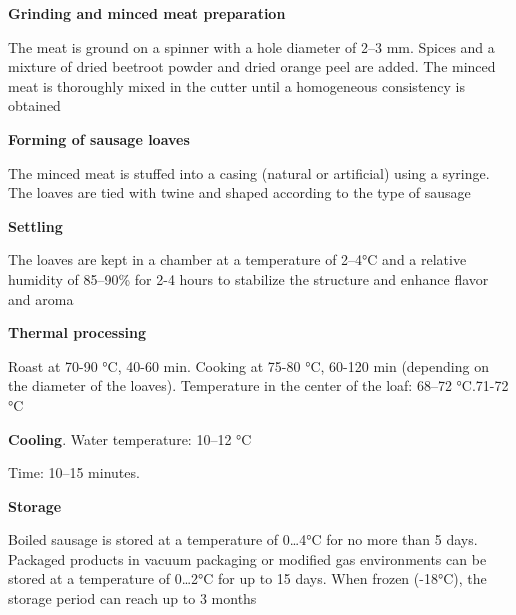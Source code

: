 \begin{multicols}{2}
{\bfseries Grinding and minced meat preparation}

The meat is ground on a spinner with a hole diameter of 2--3 mm. Spices
and a mixture of dried beetroot powder and dried orange peel are added.
The minced meat is thoroughly mixed in the cutter until a homogeneous
consistency is obtained

{\bfseries Forming of sausage loaves}

The minced meat is stuffed into a casing (natural or artificial) using a
syringe. The loaves are tied with twine and shaped according to the type
of sausage

{\bfseries Settling}

The loaves are kept in a chamber at a temperature of 2--4°C and a
relative humidity of 85--90\% for 2-4 hours to stabilize the structure
and enhance flavor and aroma

{\bfseries Thermal processing}

Roast at 70-90 °C, 40-60 min. Cooking at 75-80 °C, 60-120 min (depending
on the diameter of the loaves). Temperature in the center of the loaf:
68--72 °C.71-72 °C

{\bfseries Cooling}. Water temperature: 10--12 °C

Time: 10--15 minutes.

{\bfseries Storage}

Boiled sausage is stored at a temperature of 0\ldots4°C for no more than
5 days. Packaged products in vacuum packaging or modified gas
environments can be stored at a temperature of 0\ldots2°C for up to 15
days. When frozen (-18°C), the storage period can reach up to 3 months
\end{multicols}











